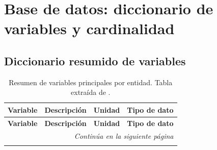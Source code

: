 
\section{Base de datos: diccionario de variables y cardinalidad}

\subsection{Diccionario resumido de variables}

\onecolumn
\footnotesize
\setlength{\LTcapwidth}{\textwidth}
\begin{longtable}{@{}p{2.8cm} p{6.8cm} p{2.2cm} p{2.2cm}@{}}
    \caption{Resumen de variables principales por entidad. Tabla extraída de \cite{greenwestdb}.}                                                                                                  \\
    \toprule
    \textbf{Variable}                                                      & \textbf{Descripción}                                           & \textbf{Unidad}              & \textbf{Tipo de dato} \\
    \midrule
    \endfirsthead
    \toprule
    \textbf{Variable}                                                      & \textbf{Descripción}                                           & \textbf{Unidad}              & \textbf{Tipo de dato} \\
    \midrule
    \endhead
    \midrule
    \multicolumn{4}{r}{\emph{Continúa en la siguiente página}}                                                                                                                                     \\
    \midrule
    \endfoot
    \bottomrule
    \endlastfoot


\end{longtable}
